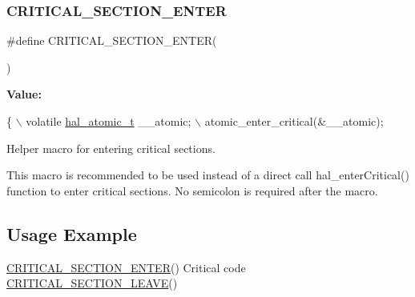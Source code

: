\subsubsection{\texorpdfstring{C\+R\+I\+T\+I\+C\+A\+L\+\_\+\+S\+E\+C\+T\+I\+O\+N\+\_\+\+E\+N\+T\+ER}{CRITICAL\_SECTION\_ENTER}}
{\footnotesize\ttfamily \#define C\+R\+I\+T\+I\+C\+A\+L\+\_\+\+S\+E\+C\+T\+I\+O\+N\+\_\+\+E\+N\+T\+ER(\begin{DoxyParamCaption}{ }\end{DoxyParamCaption})}

{\bfseries Value\+:}
\begin{DoxyCode}
\{                                                                                                          
              \(\backslash\)
        volatile \hyperlink{group__doc__driver__hal__helper__atomic_ga6b3a0c9eea25111ac1877e0302e2fe1c}{hal\_atomic\_t} \_\_atomic;                                                        
                              \(\backslash\)
        atomic\_enter\_critical(&\_\_atomic);
\end{DoxyCode}


Helper macro for entering critical sections. 

This macro is recommended to be used instead of a direct call hal\+\_\+enter\+Critical() function to enter critical sections. No semicolon is required after the macro.\hypertarget{group__doc__driver__hal__helper__atomic_atomic_usage}{}\subsection{Usage Example}\label{group__doc__driver__hal__helper__atomic_atomic_usage}

\begin{DoxyCode}
\hyperlink{group__doc__driver__hal__helper__atomic_ga039bfe712b6ba4388a35672f54763391}{CRITICAL\_SECTION\_ENTER}()
Critical code
\hyperlink{group__doc__driver__hal__helper__atomic_ga6b32c9f95e7c6b604d621e215c514015}{CRITICAL\_SECTION\_LEAVE}()
\end{DoxyCode}
 \mbox{\label{group__doc__driver__hal__helper__atomic_ga6b32c9f95e7c6b604d621e215c514015}} 
